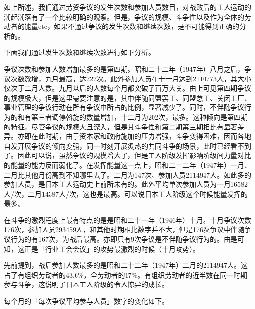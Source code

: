 \documentclass[a4paper,12pt]{article}
\begin{document}
如上所述，我们通过劳资争议的发生次数和参加人员数目，对战败后的工人运动的潮起潮落有了一个比较明确的观察。但是，争议的规模、斗争性以及作为全体的劳动者的能量etc，如果不通过争议的发生次数和继续次数，是不可能得到正确的分析的。

下面我们通过发生次数和继续次数进行如下分析。

争议次数和参加人数增加最多的是第四期。昭和二十二年（1947年）八月之后，争议次数激增，九月最高，达222次。此外参加人员在十一月达到2110773人，其大小仅次于二月人数。九月以后的人数每个月都突破了百万大关。由上可见第四期争议的规模极大，但是这里需要注意的是，其中伴随同盟罢工、同盟怠工、关闭工厂、事业管理的争议行动在所有争议中所占的比例，显著减少了。同时，不伴随争议行为的和有第三者调停斡旋的数量增加，十二月为202次，最多。这种倾向是第四期的特征，尽管争议的规模大且深入，但是其斗争性和第二期第三期相比有显著差异。亦即在此时期，由于资本家和政府施加的压力增强，斗争变得困难，因而各地自发开展争议的倾向变强，同一时刻开展炙热的共同斗争的场景，此时已经看不到了。因此可以说，虽然争议的规模增大了，但是工人阶级发挥影响阶级间力量对比的能量的能力反而弱化了。在发挥能量这一点上，昭和二十二年（1947年）一月、二月比其他月份高到不知哪里去了。二月为147次、参加人员2114947人。如此多的参加人员，是日本工人运动史上前所未有的。此外平均单次参加人员为一月16582人/次，二月14387人/次，这也是最高。可以说日本工人阶级这个时候能量发挥的最多。

在斗争的激烈程度上最有特点的是是昭和二十一年（1946年）十月。十月争议次数176次，参加人员293459人，和其他时期相比数字并不大，但是176次争议中伴随争议行为的有167次，为战后最高。亦即只有9次争议是不伴随争议行为的。由是可知，这正是「行业工会会议」的攻势最激烈的时候（十月攻势）。

先前提到，战后参加人数最多的是昭和二十二年（1947年）二月的2114947人。这占了有组织劳动者的43.6\%，全劳动者的17\%。有组织劳动者的近半数在同一时期参与斗争，这说明了日本工人阶级的令人惊异的成长。

每个月的「每次争议平均参与人员」数字的变化如下。
\end{document}
